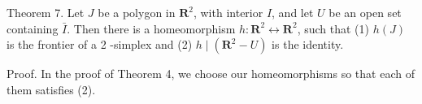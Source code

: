 Theorem 7. Let $J$ be a polygon in $\mathbf{R}^{2}$, with interior $I$, and let $U$ be an open set containing $\bar{I}$. Then there is a homeomorphism $h: \mathbf{R}^{2} \leftrightarrow \mathbf{R}^{2}$, such that (1) $h(J)$ is the frontier of a 2 -simplex and (2) $h \mid\left(\mathbf{R}^{2}-U\right)$ is the identity.

Proof. In the proof of Theorem 4, we choose our homeomorphisms so that each of them satisfies (2).
